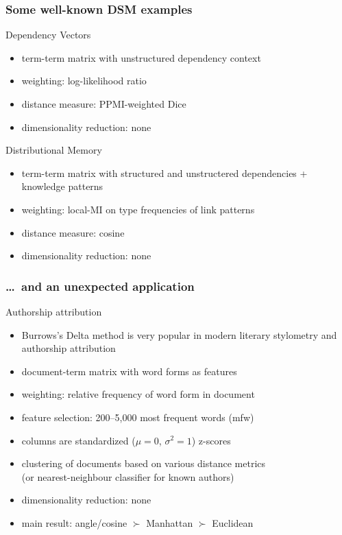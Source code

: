 \documentclass[t]{beamer} %
\begin{document}
\begin{frame}
  \frametitle{Some well-known DSM examples}

  \ungap
  \begin{block}{Dependency Vectors \citep{Pado:Lapata:07}}
    \begin{itemize}
    \item term-term matrix with unstructured dependency context
    \item weighting: log-likelihood ratio
    \item distance measure: PPMI-weighted Dice \citep{Lin:98b}
    \item dimensionality reduction: none
    \end{itemize}
  \end{block}
  
  \pause
  \begin{block} {Distributional Memory \citep{Baroni:Lenci:10}}
    \begin{itemize}
    \item term-term matrix with structured and unstructered dependencies + knowledge patterns
    \item weighting: local-MI on type frequencies of link patterns
    \item distance measure: cosine
    \item dimensionality reduction: none
    \end{itemize}
  \end{block}
\end{frame}

\begin{frame}
  \frametitle{\ldots\ and an unexpected application}

  \begin{block}{Authorship attribution \citep{Burrows:02}}
    \begin{itemize}
    \item Burrows's Delta method is very popular in modern literary stylometry and authorship attribution \citep{Evert:etc:17}
    \item document-term matrix with word forms as features 
    \item weighting: relative frequency of word form in document
    \item feature selection: 200--5,000 most frequent words (mfw)
    \item columns are standardized ($\mu = 0$, $\sigma^2 = 1$) \so z-scores
    \item clustering of documents based on various distance metrics\\
      (or nearest-neighbour classifier for known authors)
    \item dimensionality reduction: none
    \item main result: angle/cosine $\succ$ Manhattan $\succ$ Euclidean
    \end{itemize}
  \end{block}
\end{frame}
\end{document}
